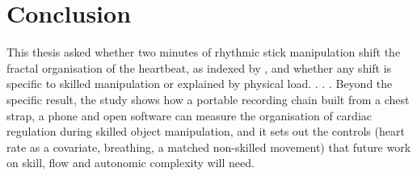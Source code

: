\section{Conclusion}
\label{sec:conclusion}


This thesis asked whether two minutes of rhythmic stick manipulation shift the fractal organisation of the heartbeat, as indexed by \aone, and whether any shift is specific to skilled manipulation or explained by physical load. . . . Beyond the specific result, the study shows how a portable recording chain built from a chest strap, a phone and open software can measure the organisation of cardiac regulation during skilled object manipulation, and it sets out the controls (heart rate as a covariate, breathing, a matched non-skilled movement) that future work on skill, flow and autonomic complexity will need.

